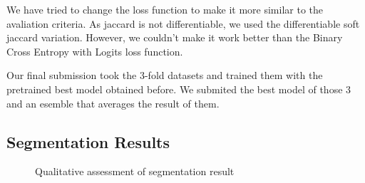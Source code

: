 \documentclass[conference]{IEEEtran}
\begin{document}
We have tried to change the loss function to make it more similar to the avaliation criteria. As jaccard is not differentiable, we used the differentiable soft jaccard variation\cite{iglovikov}. However, we couldn't make it work better than the Binary Cross Entropy with Logits loss function. 

Our final submission took the 3-fold datasets and trained them with the pretrained best model obtained before. We submited the best model of those 3 and an esemble that averages the result of them. 

\subsection{Segmentation Results}

\begin{figure}
\centering
{}\hfil
{}
\caption{Qualitative assessment of segmentation result}\label{result_samples}
\end{figure}
\end{document}
